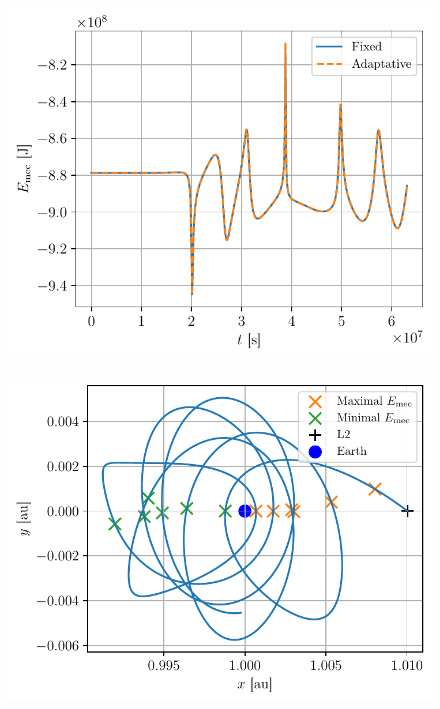 \begin{figure}[h]
    \centering
    \begin{minipage}{.45\textwidth}
        \centering
        \includegraphics[width=\linewidth]{figures/lagrange_emec.pdf}
        \label{fig:lagrange_emec}
    \end{minipage}
    \hspace*{1cm}
    \begin{minipage}{.45\textwidth}
        \centering
        \includegraphics[width=\linewidth]{figures/lagrange_max_mins_energy.pdf}
        \label{fig:lagrange_max_mins_energy}
    \end{minipage}
\end{figure}

